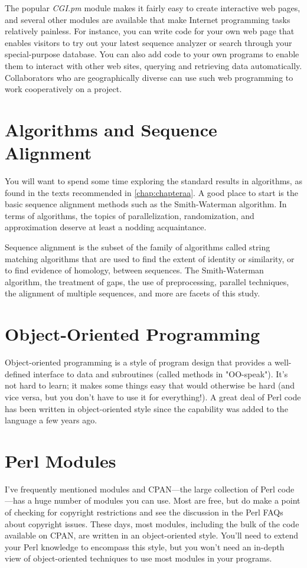 The popular \textit{CGI.pm} module makes it fairly easy to create interactive web pages, and several other modules are available that make Internet programming tasks relatively painless. For instance, you can write code for your own web page that enables visitors to try out your latest sequence analyzer or search through your special-purpose database. You can also add code to your own programs to enable them to interact with other web sites, querying and retrieving data automatically.  Collaborators who are geographically diverse can use such web programming to work cooperatively on a project. 

\section{Algorithms and Sequence Alignment}
You will want to spend some time exploring the standard results in algorithms, as found in the texts recommended in \autoref{chap:chapteraa}. A good place to start is the basic sequence alignment methods such as the Smith-Waterman algorithm. In terms of algorithms, the topics of parallelization, randomization, and approximation deserve at least a nodding acquaintance.

Sequence alignment is the subset of the family of algorithms called string matching algorithms that are used to find the extent of identity or similarity, or to find evidence of homology, between sequences. The Smith-Waterman algorithm, the treatment of gaps, the use of preprocessing, parallel techniques, the alignment of multiple sequences, and more are facets of this study. 

\section{Object-Oriented Programming}
Object-oriented programming is a style of program design that provides a well-defined interface to data and subroutines (called methods in "OO-speak"). It's not hard to learn; it makes some things easy that would otherwise be hard (and vice versa, but you don't have to use it for everything!). A great deal of Perl code has been written in object-oriented style since the capability was added to the language a few years ago. 

\section{Perl Modules}
I've frequently mentioned modules and CPAN—the large collection of Perl code—has a huge number of modules you can use. Most are free, but do make a point of checking for copyright restrictions and see the discussion in the Perl FAQs about copyright issues. These days, most modules, including the bulk of the code available on CPAN, are written in an object-oriented style. You'll need to extend your Perl knowledge to encompass this style, but you won't need an in-depth view of object-oriented techniques to use most modules in your programs.  

